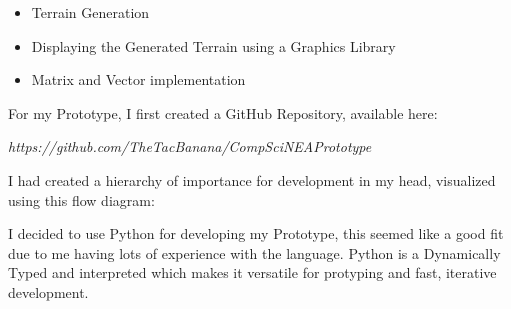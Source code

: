 \begin{flushleft}
            \vspace{0.2cm}
            \begin{itemize}
                \item Terrain Generation
                \item Displaying the Generated Terrain using a Graphics Library
                \item Matrix and Vector implementation
            \end{itemize}
            \vspace{0.2cm}

            For my Prototype, I first created a GitHub Repository, available here: 
            
            \vspace{0.1cm}
            \centerline{\textit{https://github.com/TheTacBanana/CompSciNEAPrototype}}
            \vspace{0.1cm}

            I had created a hierarchy of importance for development in my head, visualized using this flow diagram:

            \begin{center}
            \end{center}

            I decided to use Python for developing my Prototype, this seemed like a good fit due to me 
            having lots of experience with the language. Python is a Dynamically Typed and interpreted 
            which makes it versatile for protyping and fast, iterative development.
            

\end{flushleft}
